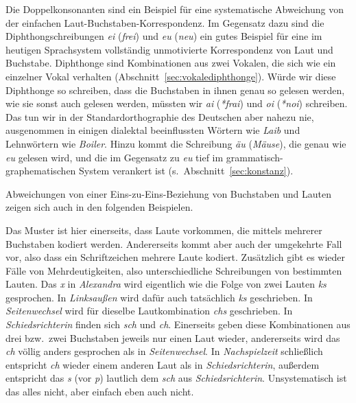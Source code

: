 Die Doppelkonsonanten sind ein Beispiel für eine systematische Abweichung von der einfachen Laut-Buchstaben-Korrespondenz.
Im Gegensatz dazu sind die Diphthongschreibungen \textit{ei} (\textit{frei}) und \textit{eu} (\textit{neu}) ein gutes Beispiel für eine im heutigen Sprachsystem vollständig unmotivierte Korrespondenz von Laut und Buchstabe.
Diphthonge sind Kombinationen aus zwei Vokalen, die sich wie ein einzelner Vokal verhalten (Abschnitt~\ref{sec:vokalediphthonge}).
Würde wir diese Diphthonge so schreiben, dass die Buchstaben in ihnen genau so gelesen werden, wie sie sonst auch gelesen werden, müssten wir \textit{ai} (\textit{*frai}) und \textit{oi} (\textit{*noi}) schreiben.
Das tun wir in der Standardorthographie des Deutschen aber nahezu nie, ausgenommen in einigen dialektal beeinflussten Wörtern wie \textit{Laib} und Lehnwörtern wie \textit{Boiler}.
Hinzu kommt die Schreibung \textit{äu} (\textit{Mäuse}), die genau wie \textit{eu} gelesen wird, und die im Gegensatz zu \textit{eu} tief im grammatisch-graphematischen System verankert ist (s.\ Abschnitt~\ref{sec:konstanz}).

Abweichungen von einer Eins-zu-Eins-Beziehung von Buchstaben und Lauten zeigen sich auch in den folgenden Beispielen.

\begin{exe}
  \ex
  \begin{xlist}
  \end{xlist}
\end{exe}

Das Muster ist hier einerseits, dass Laute vorkommen, die mittels mehrerer Buchstaben kodiert werden.
Andererseits kommt aber auch der umgekehrte Fall vor, also dass ein Schriftzeichen mehrere Laute kodiert.
Zusätzlich gibt es wieder Fälle von Mehrdeutigkeiten, also unterschiedliche Schreibungen von bestimmten Lauten.
Das \textit{x} in \textit{Alexandra} wird eigentlich wie die Folge von zwei Lauten \textit{ks} gesprochen.
In \textit{Linksaußen} wird dafür auch tatsächlich \textit{ks} geschrieben.
In \textit{Seitenwechsel} wird für dieselbe Lautkombination \textit{chs} geschrieben.
In \textit{Schiedsrichterin} finden sich \textit{sch} und \textit{ch}.
Einerseits geben diese Kombinationen aus drei bzw.\ zwei Buchstaben jeweils nur einen Laut wieder, andererseits wird das \textit{ch} völlig anders gesprochen als in \textit{Seitenwechsel}.
In \textit{Nachspielzeit} schließlich entspricht \textit{ch} wieder einem anderen Laut als in \textit{Schiedsrichterin}, außerdem entspricht das \textit{s} (vor \textit{p}) lautlich dem \textit{sch} aus \textit{Schiedsrichterin}.
Unsystematisch ist das alles nicht, aber einfach eben auch nicht.

